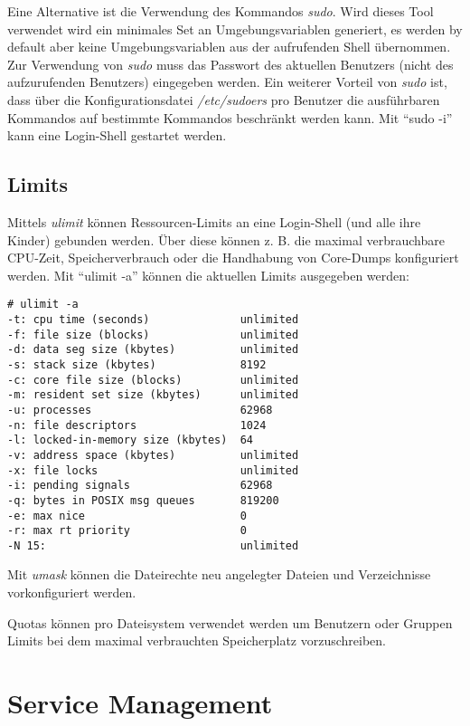 Eine Alternative ist die Verwendung des Kommandos \textit{sudo}. Wird dieses Tool verwendet wird ein minimales Set an Umgebungsvariablen generiert, es werden by default aber keine Umgebungsvariablen aus der aufrufenden Shell übernommen. Zur Verwendung von \textit{sudo} muss das Passwort des aktuellen Benutzers (nicht des aufzurufenden Benutzers) eingegeben werden. Ein weiterer Vorteil von \textit{sudo} ist, dass über die Konfigurationsdatei \textit{/etc/sudoers} pro Benutzer die ausführbaren Kommandos auf bestimmte Kommandos beschränkt werden kann. Mit ``sudo -i'' kann eine Login-Shell gestartet werden.

\section{Limits}

Mittels \textit{ulimit} können Ressourcen-Limits an eine Login-Shell (und alle ihre Kinder) gebunden werden. Über diese können z. B. die maximal verbrauchbare CPU-Zeit, Speicherverbrauch oder die Handhabung von Core-Dumps konfiguriert werden. Mit ``ulimit -a'' können die aktuellen Limits ausgegeben werden:

\begin{verbatim}
# ulimit -a    
-t: cpu time (seconds)              unlimited
-f: file size (blocks)              unlimited
-d: data seg size (kbytes)          unlimited
-s: stack size (kbytes)             8192
-c: core file size (blocks)         unlimited
-m: resident set size (kbytes)      unlimited
-u: processes                       62968
-n: file descriptors                1024
-l: locked-in-memory size (kbytes)  64
-v: address space (kbytes)          unlimited
-x: file locks                      unlimited
-i: pending signals                 62968
-q: bytes in POSIX msg queues       819200
-e: max nice                        0
-r: max rt priority                 0
-N 15:                              unlimited
\end{verbatim}

Mit \textit{umask} können die Dateirechte neu angelegter Dateien und Verzeichnisse vorkonfiguriert werden.

Quotas können pro Dateisystem verwendet werden um Benutzern oder Gruppen Limits bei dem maximal verbrauchten Speicherplatz vorzuschreiben.

\chapter{Service Management}

